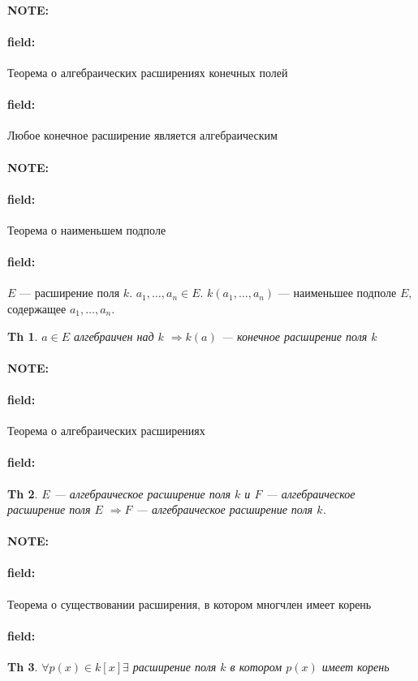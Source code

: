 \documentclass[12pt]{article}
\newenvironment{note}{\paragraph{NOTE:}}{}
\newenvironment{field}{\paragraph{field:}}{}
\newtheorem{theorem}{Th}
\begin{document}
\begin{note}
  \begin{field}
    Теорема о алгебраических расширениях конечных полей
  \end{field}
  \begin{field}
    Любое конечное расширение является алгебраическим
  \end{field}
\end{note}

\begin{note}
  \begin{field}
    Теорема о наименьшем подполе
  \end{field}
  \begin{field}
    $E$ --- расширение поля $k$.
    $a_{1}, \ldots, a_{n} \in E$.
    $k(a_{1}, \ldots, a_{n})$ --- наименьшее подполе $E$,
    содержащее $a_{1}, \ldots, a_{n}$.

    \begin{theorem}
      $a \in E$ алгебраичен над $k$
      $\Rightarrow k(a)$ --- конечное расширение поля $k$
    \end{theorem}
  \end{field}
\end{note}

\begin{note}
  \begin{field}
    Теорема о алгебраических расширениях
  \end{field}
  \begin{field}
    \begin{theorem}
      $E$ --- алгебраическое расширение поля $k$
      и $F$ --- алгебраическое расширение поля $E$
      $\Rightarrow F$ --- алгебраическое расширение поля $k$.
    \end{theorem}
  \end{field}
\end{note}

\begin{note}
  \begin{field}
    Теорема о существовании расширения, в котором многчлен имеет корень
  \end{field}
  \begin{field}
    \begin{theorem}
      $\forall p(x) \in k[x] \exists$
      расширение поля $k$ в котором $p(x)$ имеет корень
    \end{theorem}
  \end{field}
\end{note}
\end{document}
